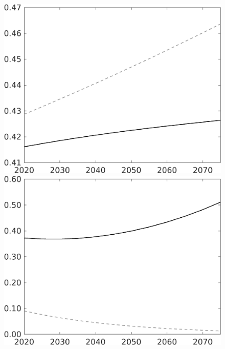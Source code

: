 \documentclass[12pt]{article}
\begin{document}
\begin{figure}[h!!]
\begin{minipage}[]{0.32\textwidth}
	\end{minipage}	
	\begin{minipage}[]{0.32\textwidth}
		\includegraphics[width=1\textwidth]{../../codding_model/own_basedOnFried/optimalPol_010922_revision/figures/all_13Sept22/LevTaufNoTauf_TaulCalib_regime0_EY_spillover0_nsk1_xgr1_knspil1_sep1_LFlimit0_emsbase0_countec0_GovRev0_etaa0.79_lgd0.png}
	\end{minipage}	
	\begin{minipage}[]{0.32\textwidth}
		\includegraphics[width=1\textwidth]{../../codding_model/own_basedOnFried/optimalPol_010922_revision/figures/all_13Sept22/LevTaufNoTauf_TaulCalib_regime0_GFF_spillover0_nsk1_xgr1_knspil1_sep1_LFlimit0_emsbase0_countec0_GovRev0_etaa0.79_lgd0.png}

\end{minipage}
\end{figure}
\end{document}
